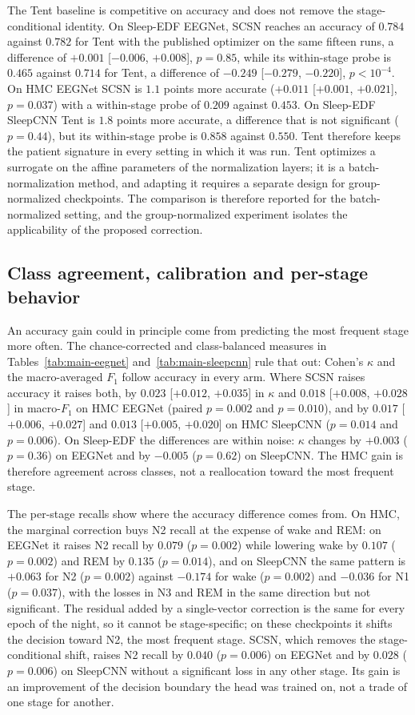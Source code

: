 The Tent baseline is competitive on accuracy and does not remove the
stage-conditional identity. On Sleep-EDF EEGNet, SCSN reaches an accuracy of
$0.784$ against $0.782$ for Tent with the published optimizer on the same
fifteen runs, a difference of $+0.001$ [$-0.006$, $+0.008$], $p=0.85$, while
its within-stage probe is $0.465$ against $0.714$ for Tent, a difference of $-0.249$
[$-0.279$, $-0.220$], $p<10^{-4}$. On HMC EEGNet SCSN is $1.1$ points more
accurate ($+0.011$ [$+0.001$, $+0.021$], $p=0.037$) with a within-stage probe
of $0.209$ against $0.453$. On Sleep-EDF SleepCNN Tent is $1.8$ points more
accurate, a difference that is not significant ($p=0.44$), but its
within-stage probe is $0.858$ against $0.550$. Tent therefore keeps the patient
signature in every setting in which it was run. Tent optimizes a surrogate on the affine
parameters of the normalization layers; it is a batch-normalization method,
and adapting it requires a separate design for group-normalized checkpoints.
The comparison is therefore reported for the batch-normalized setting, and
the group-normalized experiment isolates the applicability of the proposed
correction.

\subsection{Class agreement, calibration and per-stage behavior}
\label{sec:agreement}

An accuracy gain could in principle come from predicting the most frequent
stage more often. The chance-corrected and class-balanced measures in
Tables~\ref{tab:main-eegnet} and~\ref{tab:main-sleepcnn} rule that out: Cohen's
$\kappa$ and the macro-averaged $F_1$ follow accuracy in every arm. Where SCSN
raises accuracy it raises both, by $0.023$ [$+0.012$, $+0.035$] in $\kappa$
and $0.018$ [$+0.008$, $+0.028$] in macro-$F_1$ on HMC EEGNet (paired
$p=0.002$ and $p=0.010$), and by $0.017$ [$+0.006$, $+0.027$] and $0.013$
[$+0.005$, $+0.020$] on HMC SleepCNN ($p=0.014$ and $p=0.006$). On Sleep-EDF the
differences are within noise: $\kappa$ changes by $+0.003$ ($p=0.36$) on
EEGNet and by $-0.005$ ($p=0.62$) on SleepCNN. The HMC gain is therefore
agreement across classes, not a reallocation toward the most frequent stage.

The per-stage recalls show where the accuracy difference comes from. On HMC,
the marginal correction buys N2 recall at the expense of wake and REM: on
EEGNet it raises N2 recall by $0.079$ ($p=0.002$) while lowering wake by
$0.107$ ($p=0.002$) and REM by $0.135$ ($p=0.014$), and on SleepCNN the same
pattern is $+0.063$ for N2 ($p=0.002$) against $-0.174$ for wake ($p=0.002$)
and $-0.036$ for N1 ($p=0.037$), with the losses in N3 and REM in the same
direction but not significant. The residual added by a single-vector correction is the
same for every epoch of the night, so it cannot be stage-specific; on these
checkpoints it shifts the decision toward N2, the most frequent stage. SCSN, which
removes the stage-conditional shift, raises N2 recall by $0.040$ ($p=0.006$)
on EEGNet and by $0.028$ ($p=0.006$) on SleepCNN without a significant loss
in any other stage. Its gain is an improvement of the decision boundary the
head was trained on, not a trade of one stage for another.

